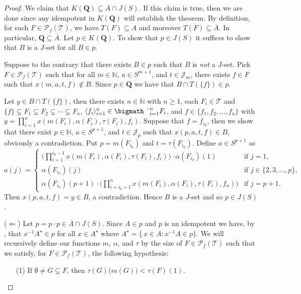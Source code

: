\documentclass[12pt,showtrims]{memoir}
\theoremstyle{plain}
\theoremstyle{definition}
\newcommand{\la}{\langle}
\newcommand{\ra}{\rangle}
\newcommand{\bbN}{\mathbb{N}}
\newcommand{\calJ}{\mathcal{J}}
\newcommand{\calT}{\mathcal{T}}
\newcommand{\Pf}{\mathcal{P}_f}
\newcommand{\bigtimes}{\hbox{\bigmath \char'2}}
\begin{document}
\begin{proof}
  We claim that $K(\mathbf{Q}) \subseteq \overline{A} \cap J(S)$. 
  If this claim is true, then we are done since any idempotent in $K(\mathbf{Q})$ will establish the theorem. 
  By definition, for each $F \in \Pf(\calT)$, we have $T(F) \subseteq A$ and moreover $\overline{T(F)} \subseteq \overline{A}$.
  In particular, $\mathbf{Q} \subseteq \overline{A}$. 
  Let $p \in K(\mathbf{Q})$.
  To show that $p \in J(S)$ it suffices to show that $B$ is a $J$-set for all $B \in p$. 

  Suppose to the contrary that there exists $B \in p$ such that $B$ is \textsl{not} a $J$-set. 
  Pick $F \in \Pf(\calT)$ such that for all $m \in \bbN$, $a \in S^{m+1}$, and $t \in \calJ_m$, there exists $f \in F$ such that $x(m, a, t, f) \not\in B$. 
  Since $p \in \mathbf{Q}$ we have that $B \cap T(\{f\}) \in p$. 
  
  Let $y \in B \cap T(\{f\})$, then there exists $n \in \bbN$ with $n \ge 1$, each $F_i \in \calT$ and $\{f\} \subsetneq F_1 \subsetneq F_2 \subsetneq \cdots \subsetneq F_n$, $\la f_i \ra_{i=1}^n \in \bigtimes_{i=1}^n F_i$, and $f \in \{f_1, f_2, \ldots, f_n\}$ with $y = \prod_{i=1}^n x(m(F_i), \alpha(F_i), \tau(F_i), f_i)$.
  Suppose that $f = f_{i_0}$, then we show that there exist $p \in \bbN$, $a \in S^{p+1}$, and $t \in \calJ_p$ such that $x(p, a, t, f) \in B$, obviously a contradiction. 
  Put $p = m(F_{i_0})$ and $t = \tau(F_{i_0})$. 
  Define $a \in S^{p+1}$ as
  \[
    a(j) =
    \begin{cases}
      \bigl( \prod_{i=1}^{i_0-1} x(m(F_i), \alpha(F_i), \tau(F_i), f_i) \bigr) \cdot \alpha(F_{i_0})(1) & \mbox{if $j = 1$,} \\
      \alpha(F_{i_0})(j) & \mbox{if $j \in \{2, 3, \ldots, p\}$,} \\
      \alpha(F_{i_0})(p+1) \cdot \bigl( \prod_{i=i_0+1}^n x(m(F_i), \alpha(F_i), \tau(F_i), f_n) \bigr) & \mbox{if $j = p+1$.}
    \end{cases}
  \]
  Then $x(p, a, t, f) = y \in B$, a contradiction.
  Hence $B$ is a $J$-set and so $p \in J(S)$.

  ($\Leftarrow$)
  Let $p = p \cdot p \in \overline{A} \cap J(S)$.
  Since $A \in p$ and $p$ is an idempotent we have, by \cite[Lemma 4.14]{Hindman:1998fk}, that $x^{-1}A^\star \in p$ for all $x \in A^\star$ where $A^\star = \{\, x \in A : x^{-1}A \in p\}$. 
  We will recursively define our functions $m$, $\alpha$, and $\tau$ by the size of $F \in \Pf(\calT)$ such that we satisfy, for $F \in \Pf(\calT)$, the following hypothesis:
  \begin{itemize}
    \item[(1)] If $\emptyset \ne G \subsetneq F$, then $\tau(G)\bigl( m(G) \bigr) < \tau(F)(1)$.
    

\end{itemize}
\end{proof}
\end{document}
